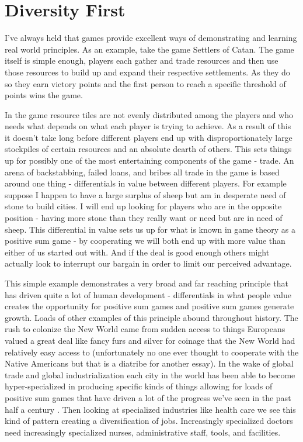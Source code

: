 \documentclass[11pt,a5paper]{book}
\begin{document}
\section{Diversity First}
I've always held that games provide excellent ways of demonstrating and learning real world principles. As an example, take the game Settlers of Catan. The game itself is simple enough, players each gather and trade resources and then use those resources to build up and expand their respective settlements. As they do so they earn victory points and the first person to reach a specific threshold of points wins the game. 
\newline

In the game resource tiles are not evenly distributed among the players and who needs what depends on what each player is trying to achieve. As a result of this it doesn't take long before different players end up with disproportionately large stockpiles of certain resources and an absolute dearth of others. This sets things up for possibly one of the most entertaining components of the game - trade. An arena of backstabbing, failed loans, and bribes all trade in the game is based around one thing - differentials in value between different players. For example suppose I happen to have a large surplus of sheep but am in desperate need of stone to build cities. I will end up looking for players who are in the opposite position - having more stone than they really want or need but are in need of sheep. This differential in value sets us up for what is known in game theory as a positive sum game - by cooperating we will both end up with more value than either of us started out with. And if the deal is good enough others might actually look to interrupt our bargain in order to limit our perceived advantage. 
\newline

This simple example demonstrates a very broad and far reaching principle that has driven quite a lot of human development - differentials in what people value creates the opportunity for positive sum games and positive sum games generate growth. Loads of other examples of this principle abound throughout history. The rush to colonize the New World came from sudden access to things Europeans valued a great deal like fancy furs and silver for coinage that the New World had relatively easy access to (unfortunately no one ever thought to cooperate with the Native Americans but that is a diatribe for another essay). In the wake of global trade and global industrialization each city in the world has been able to become hyper-specialized in producing specific kinds of things allowing for loads of positive sum games that have driven a lot of the progress we've seen in the past half a century \cite{zeihan}. Then looking at specialized industries like health care we see this kind of pattern creating a diversification of jobs. Increasingly specialized doctors need increasingly specialized nurses, administrative staff, tools, and facilities.
\newline
\end{document}
